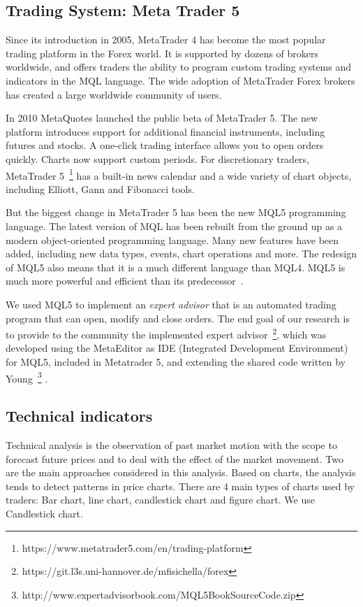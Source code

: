 \subsection{Trading System: Meta Trader 5}
\label{sec:mt5}
Since its introduction in 2005, MetaTrader 4 has become the most popular trading platform in the Forex world. It is supported by dozens of brokers worldwide, and offers traders the ability to program custom trading systems and indicators in the MQL language. The wide adoption of MetaTrader Forex brokers has created a large worldwide community of users.

In 2010 MetaQuotes launched the public beta of MetaTrader 5. The new platform introduces support for additional financial instruments, including futures and stocks. A one-click trading interface allows you to open orders quickly. Charts now support custom periods. For discretionary traders, MetaTrader 5~\footnote{https://www.metatrader5.com/en/trading-platform}  has a built-in news calendar and a wide variety of chart objects, including Elliott, Gann and Fibonacci tools.

But the biggest change in MetaTrader 5 has been the new MQL5 programming language. The latest version of MQL has been rebuilt from the ground up as a modern object-oriented programming language. Many new features have been added, including new data types, events, chart operations and more. The redesign of MQL5 also means that it is a much different language than MQL4. MQL5 is much more powerful and efficient than its predecessor~\cite{young13}. 

We used MQL5 to implement an \textit{expert advisor} that is an automated trading program that can open, modify and close orders. The end goal of our research is to provide to the community the implemented expert advisor~\footnote{https://git.l3s.uni-hannover.de/mfisichella/forex}, which was developed using the MetaEditor as IDE (Integrated Development Environment) for MQL5, included in Metatrader 5, and extending the shared code written by Young~\footnote{http://www.expertadvisorbook.com/MQL5BookSourceCode.zip} . 

\subsection{Technical indicators}
\label{sec:techInd}
Technical analysis is the observation of past market motion with the scope to forecast future prices and to deal with the effect of the market movement. Two are the main approaches considered in this analysis. Based on charts, the analysis tends to detect patterns in price charts. There are 4 main types of charts used by traders: Bar chart, line chart, candlestick chart and figure chart. We use Candlestick chart.

